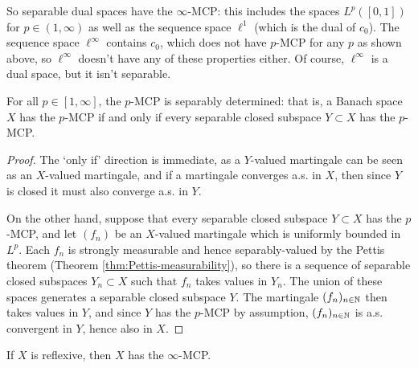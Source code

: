 So separable dual spaces have the $\infty$-MCP: this includes the spaces $L^p([0,1])$ for $p \in (1,\infty)$ as well as the sequence space $\ell^1$ (which is the dual of $c_0$).
The sequence space $\ell^\infty$ contains $c_0$, which does not have $p$-MCP for any $p$ as shown above, so $\ell^\infty$ doesn't have any of these properties either.
Of course, $\ell^\infty$ is a dual space, but it isn't separable.

\begin{lem}\label{lem:MCP-sepdet}
  For all $p \in [1,\infty]$, the $p$-MCP is separably determined: that is, a Banach space $X$ has the $p$-MCP if and only if every separable closed subspace $Y \subset X$ has the $p$-MCP.
\end{lem}

\begin{proof}
  The `only if' direction is immediate, as a $Y$-valued martingale can be seen as an $X$-valued martingale, and if a martingale converges a.s. in $X$, then since $Y$ is closed it must also converge a.s. in $Y$.

  On the other hand, suppose that every separable closed subspace $Y \subset X$ has the $p$-MCP, and let $(f_n)$ be an $X$-valued martingale which is uniformly bounded in $L^p$.
  Each $f_n$ is strongly measurable and hence separably-valued by the Pettis theorem (Theorem \ref{thm:Pettis-measurability}), so there is a sequence of separable closed subspaces $Y_n \subset X$ such that $f_n$ takes values in $Y_n$.
  The union of these spaces generates a separable closed subspace $Y$.
  The martingale $(f_n)_{n \in \mathbb{N}}$ then takes values in $Y$, and since $Y$ has the $p$-MCP by assumption, $(f_n)_{n \in \mathbb{N}}$ is a.s. convergent in $Y$, hence also in $X$.
\end{proof}

\begin{cor}\label{cor:MCP-reflexive}
  If $X$ is reflexive, then $X$ has the $\infty$-MCP.
\end{cor}


